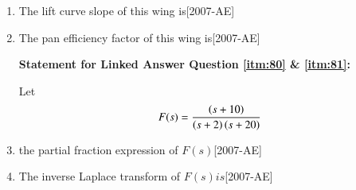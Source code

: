 \documentclass[journal]{IEEEtran}
\begin{document}
\begin{enumerate}
    \item The lift curve slope of this wing is\label{itm:78}\hfill{[2007-AE]}
        \begin{enumerate}
        \end{enumerate}
    \item The pan efficiency factor of this wing is\label{itm:79}\hfill{[2007-AE]}
        \begin{enumerate}
        \end{enumerate}

\textbf{Statement for Linked Answer Question \ref{itm:80} \& \ref{itm:81}:}

Let $$F(s) = \frac{\left(s+10\right)}{\left(s+2\right)\left(s+20\right)}$$

    \item the partial fraction expression of $F(s)$\label{itm:80}\hfill{[2007-AE]}
        \begin{enumerate}
        \end{enumerate}
    \item The inverse Laplace transform of $F(s) is$\label{itm:81}\hfill{[2007-AE]}
        \begin{enumerate}
        \end{enumerate}


\end{enumerate}
\end{document}
